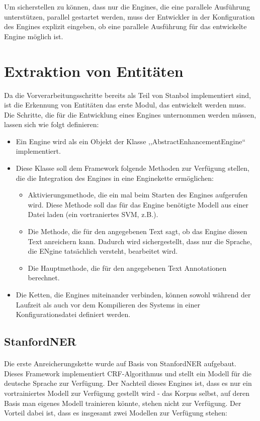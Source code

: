 Um sicherstellen zu können, dass nur die Engines, die eine parallele Ausführung unterstützen, parallel gestartet werden, muss der Entwickler in der Konfiguration des Engines explizit eingeben, ob eine parallele Ausführung für das entwickelte Engine möglich ist.

\section{Extraktion von Entitäten} \label{sec:extraktimpl}
Da die Vorverarbeitungsschritte bereits als Teil von Stanbol implementiert sind, ist die Erkennung von Entitäten das erste Modul, das entwickelt werden muss. Die Schritte, die für die Entwicklung eines Engines unternommen werden müssen, lassen sich wie folgt definieren:
\begin{itemize}
\item Ein Engine wird als ein Objekt der Klasse ,,AbstractEnhancementEngine`` implementiert. 
\item Diese Klasse soll dem Framework folgende Methoden zur Verfügung stellen, die die Integration des Engines in eine Enginekette ermöglichen:
\begin{itemize}
\item Aktivierungsmethode, die ein mal beim Starten des Engines aufgerufen wird. Diese Methode soll das für das Engine benötigte Modell aus einer Datei laden (ein vortraniertes SVM, z.B.).
\item Die Methode, die für den angegebenen Text sagt, ob das Engine diesen Text anreichern kann. Dadurch wird sichergestellt, dass nur die Sprache, die ENgine tatsächlich versteht, bearbeitet wird.
\item Die Hauptmethode, die für den angegebenen Text Annotationen berechnet.
\end{itemize}
\item Die Ketten, die Engines miteinander verbinden, können sowohl während der Laufzeit als auch vor dem Kompilieren des Systems in einer Konfigurationsdatei definiert werden.
\end{itemize}

\subsection{StanfordNER} \label{subsec:stanfordner}
\paragraph{}
Die erste Anreicherungskette wurde auf Basis von StanfordNER\cite{Jenny/etal:07} aufgebaut. Dieses Framework implementiert CRF-Algorithmus und stellt ein Modell für die deutsche Sprache zur Verfügung\cite{faruqui10:_training}. Der Nachteil dieses Engines ist, dass es nur ein vortrainiertes Modell zur Verfügung gestellt wird - das Korpus selbst, auf deren Basis man eigenes Modell trainieren könnte, stehen nicht zur Verfügung. Der Vorteil dabei ist, dass es insgesamt zwei Modellen zur Verfügung stehen:

